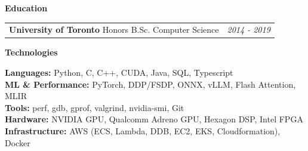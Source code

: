 \documentclass[letterpaper,10pt]{article}
\makeatletter
\newcommand{\resitem}[1]{\item #1 \vspace{0pt}}
\newcommand{\resheading}[1]{{\textbf{\Large{#1} \vphantom{p\^{E}}}\vspace{7pt}}}
\newcommand{\ressubheading}[4]{
\begin{tabular*}{7in}{l@{\extracolsep{\fill}}r}
		\textbf{#1} #2 & \textit{#4} \\
\end{tabular*}\vspace{0pt}}
\makeatother
\begin{document}




\resheading{Education}
\ressubheading{University of Toronto}{Honors B.Sc. Computer Science}{}{2014 - 2019}






\resheading{Technologies}
\vspace{2pt}

\textbf{Languages:}  Python, C, C++, CUDA, Java, SQL, Typescript \\
\textbf{ML \& Performance:} PyTorch, DDP/FSDP, ONNX, vLLM, Flash Attention, MLIR \\
\textbf{Tools:} perf, gdb, gprof, valgrind, nvidia-smi, Git \\
\textbf{Hardware:} NVIDIA GPU, Qualcomm Adreno GPU, Hexagon DSP, Intel FPGA \\
\textbf{Infrastructure:} AWS (ECS, Lambda, DDB, EC2, EKS, Cloudformation), Docker

\end{document}
